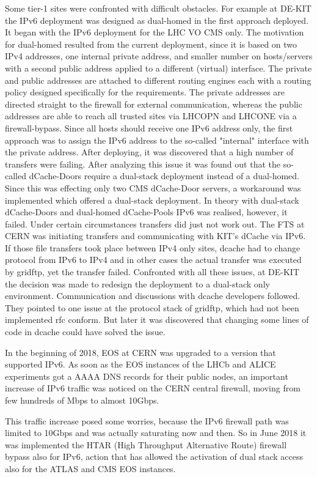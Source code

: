 Some tier-1 sites were confronted with difficult obstacles. For example at DE-KIT the IPv6 deployment was designed as dual-homed in the first approach deployed. It began with the IPv6 deployment for the LHC VO CMS only. The motivation for dual-homed resulted from the current deployment, since it is based on two IPv4 addresses, one internal private address, and smaller number on hosts/servers with a second public address applied to a different (virtual) interface. The private and public addresses are attached to different routing engines each with a routing policy designed specifically for the requirements. The private addresses are directed straight to the firewall for external communication, whereas the public addresses are able to reach all trusted sites via LHCOPN and LHCONE via a firewall-bypass. Since all hosts should receive one IPv6 address only, the first approach was to assign the IPv6 address to the so-called "internal" interface with the private address. After deploying, it was discovered that a high number of transfers were failing. After analyzing this issue it was found out that the so-called dCache-Doors require a dual-stack deployment instead of a dual-homed. Since this was effecting only two CMS dCache-Door servers, a workaround was implemented which offered a dual-stack deployment. In theory with dual-stack dCache-Doors and dual-homed dCache-Pools IPv6 was realised, however, it failed. Under certain circumstances transfers did just not work out. The FTS at CERN was initiating transfers and communicating with KIT’s  dCache via IPv6. If those file transfers took place between IPv4 only sites, dcache had to change protocol from IPv6 to IPv4 and in other cases the actual transfer was  executed by gridftp, yet the transfer failed. Confronted with all these issues, at DE-KIT the decision was made to redesign the deployment to a dual-stack only environment.  Communication and discussions with dcache developers followed. They pointed to one issue at the protocol stack of gridftp, which had not been implemented rfc conform. But later it was discovered that changing some lines of code in dcache could have solved the issue.
  
In the beginning of 2018, EOS at CERN was upgraded to a version that supported IPv6.  
As soon as the EOS instances of the LHCb and ALICE experiments got a AAAA DNS records for their public nodes, an important increase of IPv6 traffic was noticed on the CERN central firewall, moving from few hundreds of Mbps to almost 10Gbps. 
 
This traffic increase posed some worries, because the IPv6 firewall path was limited to 10Gbps and was actually saturating now and then. So in June 2018 it was implemented the HTAR (High Throughput Alternative Route) firewall bypass also for IPv6, action that has allowed the activation of dual stack access also for the ATLAS and CMS EOS instances.    
 
